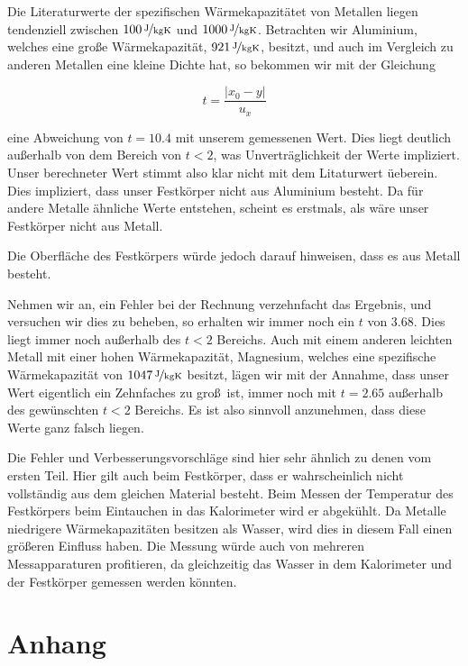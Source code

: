\documentclass[11pt,a4paper]{article}
\begin{document}
Die Literaturwerte der spezifischen W\"armekapazit\"atet von Metallen liegen tendenziell zwischen $100\,\nicefrac{\mathrm{J}}{\mathrm{kgK}}$ und $1000\,\nicefrac{\mathrm{J}}{\mathrm{kgK}}$. Betrachten wir Aluminium, welches eine gro\ss e W\"armekapazit\"at, $921\,\nicefrac{\mathrm{J}}{\mathrm{kgK}}$, besitzt, und auch im Vergleich zu anderen Metallen eine kleine Dichte hat, so bekommen wir mit der Gleichung

\begin{equation}
t=\frac{|x_0-y|}{u_x}\label{abw}
\end{equation}

eine Abweichung von $t=10.4$ mit unserem gemessenen Wert. Dies liegt deutlich au\ss erhalb von dem Bereich von $t<2$, was Unvertr\"aglichkeit der Werte impliziert. Unser berechneter Wert stimmt also klar nicht mit dem Litaturwert \"ueberein. Dies impliziert, dass unser Festk\"orper nicht aus Aluminium besteht. Da f\"ur andere Metalle \"ahnliche Werte entstehen, scheint es erstmals, als w\"are unser Festk\"orper nicht aus Metall.

Die Oberfl\"ache des Festk\"orpers w\"urde jedoch darauf hinweisen, dass es aus Metall besteht.

Nehmen wir an, ein Fehler bei der Rechnung verzehnfacht das Ergebnis, und versuchen wir dies zu beheben, so erhalten wir immer noch ein $t$ von 3.68. Dies liegt immer noch au\ss erhalb des $t<2$ Bereichs. Auch mit einem anderen leichten Metall mit einer hohen W\"armekapazit\"at, Magnesium, welches eine spezifische W\"armekapazit\"at von $1047\,\nicefrac{\mathrm{J}}{\mathrm{kgK}}$ besitzt, l\"agen wir mit der Annahme, dass unser Wert eigentlich ein Zehnfaches zu gro\ss\ ist, immer noch mit $t=2.65$ au\ss erhalb des gew\"unschten $t<2$ Bereichs.  Es ist also sinnvoll anzunehmen, dass diese Werte ganz falsch liegen.

Die Fehler und Verbesserungsvorschl\"age sind hier sehr \"ahnlich zu denen vom ersten Teil. Hier gilt auch beim Festk\"orper, dass er wahrscheinlich nicht vollst\"andig aus dem gleichen Material besteht. Beim Messen der Temperatur des Festk\"orpers beim Eintauchen in das Kalorimeter wird er abgek\"uhlt. Da Metalle niedrigere W\"armekapazit\"aten besitzen als Wasser, wird dies in diesem Fall einen gr\"o\ss eren Einfluss haben. Die Messung w\"urde auch von mehreren Messapparaturen profitieren, da  gleichzeitig das Wasser in dem Kalorimeter und der Festk\"orper gemessen werden k\"onnten.


\vspace{55pt}
\section{Anhang}
\vspace{22pt}
\end{document}
